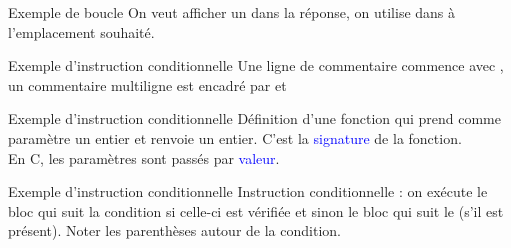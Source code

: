 \documentclass[10pt]{beamer}
\begin{document}
\begin{frame}{\Ctitle}{\stitle}
	\begin{exampleblock}{Exemple de boucle}
		\medskip
		On veut afficher un  dans la réponse, on utilise  dans  à l'emplacement souhaité.
	\end{exampleblock}
\end{frame}

\begin{frame}{\Ctitle}{\stitle}
	\begin{exampleblock}{Exemple d'instruction conditionnelle}
		\medskip
		Une ligne de commentaire commence avec \kw{//}, un commentaire multiligne est encadré par \kw{/*} et \kw{*/}
	\end{exampleblock}
\end{frame}

\begin{frame}{\Ctitle}{\stitle}
	\begin{exampleblock}{Exemple d'instruction conditionnelle}
		\medskip
		Définition d'une fonction  qui prend comme paramètre un entier et renvoie un entier. C'est la \textcolor{blue}{signature} de la fonction. \\
		\textcolor{BrickRed}{\important} En C, les paramètres sont passés par \textcolor{blue}{valeur}.
	\end{exampleblock}
\end{frame}

\begin{frame}{\Ctitle}{\stitle}
	\begin{exampleblock}{Exemple d'instruction conditionnelle}
		\medskip
		Instruction conditionnelle : on exécute le bloc qui suit la condition si celle-ci est vérifiée et sinon le bloc qui suit le  (s'il est présent).
		Noter les parenthèses autour de la condition.
	\end{exampleblock}
\end{frame}
\end{document}
